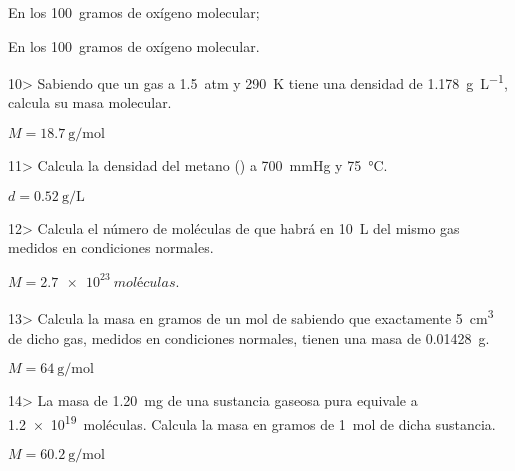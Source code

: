 \documentclass[10pt]{article}
\begin{document}
\begin{multicols}{2}
\begin{solution}
  \begin{enumerate*}
    \item En los \SI{100}{gramos} de oxígeno molecular;
    \item En los \SI{100}{gramos} de oxígeno molecular.
  \end{enumerate*}
\end{solution}

\begin{exercise}
  10> Sabiendo que un gas a \SI{1,5}{atm} y \SI{290}{\kelvin} tiene una densidad de \SI{1,178}{\gram\per\liter}, calcula su masa molecular.
\end{exercise}
\begin{solution}
  $M = \SI{18,7}{\gram\per\mole}$
\end{solution}

\begin{exercise}
  11> Calcula la densidad del metano () a \SI{700}{\mmHg} y \SI{75}{\celsius}.
\end{exercise}
\begin{solution}
  $d = \SI{0,52}{\gram\per\liter}$
\end{solution}

\begin{exercise}
  12> Calcula el número de moléculas de  que habrá en \SI{10}{\liter} del mismo gas medidos en condiciones normales.
\end{exercise}

\begin{solution}
  $M = \SI{2,7e23}{moléculas}$.
\end{solution}

\begin{exercise}
  13> Calcula la masa en gramos de un mol de  sabiendo que
  exactamente \SI{5}{\cubic\centi\meter} de dicho gas, medidos en condiciones
  normales, tienen una masa de \SI{0,01428}{\gram}.
\end{exercise}
\begin{solution}
  $M = \SI{64}{\gram\per\mole}$
\end{solution}

\begin{exercise}
  14> La masa de \SI{1,20}{\milli\gram} de una sustancia gaseosa pura equivale
  a \SI{1,2e19}{moléculas}. Calcula la masa en gramos de \SI{1}{\mole} de dicha sustancia.
\end{exercise}
\begin{solution}
  $M = \SI{60,2}{\gram\per\mole}$
\end{solution}


\end{multicols}
\end{document}
